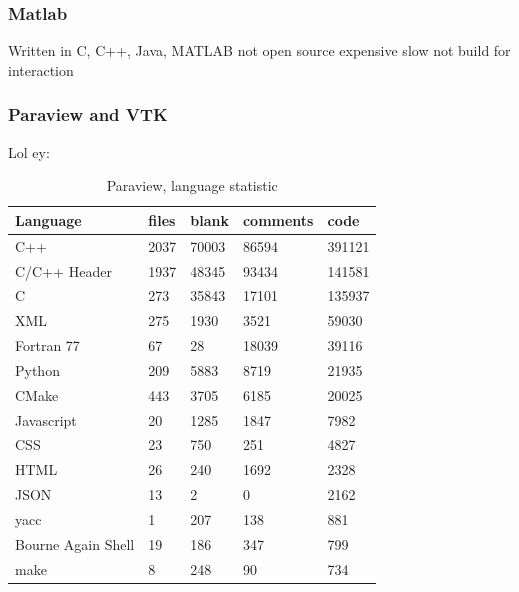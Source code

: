 \subsubsection{Matlab}
Written in C, C++, Java, MATLAB
not open source
expensive
slow
not build for interaction


\subsubsection{Paraview and VTK}
Lol ey: 
\begin{table}[h]
	\centering
	\caption{Paraview, language statistic}
    \sffamily 
	\begin{tabular}{ l|l|l|l|l }
		\hline
		\textbf{Language}              &\textbf{files} &\textbf{blank} &\textbf{comments} & \textbf{code} \\
		\hline
		C++                            &2037          &70003         &86594         & 391121\\
		C/C++ Header                   &1937          &48345         & 93434        & 141581\\
		C                              & 273          &35843         & 17101        & 135937\\
		XML                            & 275          & 1930         &  3521        &  59030\\
		Fortran 77                     &  67          &   28         & 18039        &  39116\\
		Python                         & 209          & 5883         &  8719        &  21935\\
		CMake                          & 443          & 3705         &  6185        &  20025\\
		Javascript                     &  20          & 1285         &  1847        &   7982\\
		CSS                            &  23          &  750         &   251        &   4827\\
		HTML                           &  26          &  240         &  1692        &   2328\\
		JSON                           &  13          &    2         &     0        &   2162\\
		yacc                           &   1          &  207         &   138        &    881\\
		Bourne Again Shell             &  19          &  186         &   347        &    799\\
		make                           &   8          &  248         &    90        &    734\\

\end{tabular}
\end{table}
